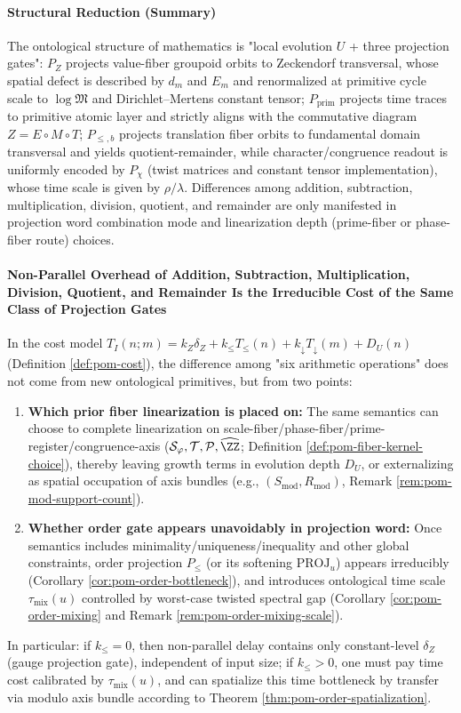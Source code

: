 \paragraph{Structural Reduction (Summary)}
The ontological structure of mathematics is "local evolution $U$ + three projection gates": $P_Z$ projects value-fiber groupoid orbits to Zeckendorf transversal, whose spatial defect is described by $d_m$ and $E_m$ and renormalized at primitive cycle scale to $\log\mathfrak{M}$ and Dirichlet--Mertens constant tensor; $P_{\mathrm{prim}}$ projects time traces to primitive atomic layer and strictly aligns with the commutative diagram $Z=E\circ M\circ T$; $P_{\le,b}$ projects translation fiber orbits to fundamental domain transversal and yields quotient-remainder, while character/congruence readout is uniformly encoded by $P_\chi$ (twist matrices and constant tensor implementation), whose time scale is given by $\rho/\lambda$. Differences among addition, subtraction, multiplication, division, quotient, and remainder are only manifested in projection word combination mode and linearization depth (prime-fiber or phase-fiber route) choices.

\paragraph{Non-Parallel Overhead of Addition, Subtraction, Multiplication, Division, Quotient, and Remainder Is the Irreducible Cost of the Same Class of Projection Gates}
In the cost model
\(
T_I(n;m)=k_Z\delta_Z+k_{\le}T_{\le}(n)+k_{\downarrow}T_{\downarrow}(m)+D_U(n)
\)
(Definition \ref{def:pom-cost}), the difference among "six arithmetic operations" does not come from new ontological primitives, but from two points:
\begin{enumerate}
  \item \textbf{Which prior fiber linearization is placed on:} The same semantics can choose to complete linearization on scale-fiber/phase-fiber/prime-register/congruence-axis (\(\mathcal{S}_\varphi,\mathcal{T},\mathcal{P},\widehat{\ZZ}\); Definition \ref{def:pom-fiber-kernel-choice}), thereby leaving growth terms in evolution depth \(D_U\), or externalizing as spatial occupation of axis bundles (e.g., \((S_{\mathrm{mod}},R_{\mathrm{mod}})\), Remark \ref{rem:pom-mod-support-count}).
  \item \textbf{Whether order gate appears unavoidably in projection word:} Once semantics includes minimality/uniqueness/inequality and other global constraints, order projection \(P_{\le}\) (or its softening \(\mathrm{PROJ}_u\)) appears irreducibly (Corollary \ref{cor:pom-order-bottleneck}), and introduces ontological time scale \(\tau_{\mathrm{mix}}(u)\) controlled by worst-case twisted spectral gap (Corollary \ref{cor:pom-order-mixing} and Remark \ref{rem:pom-order-mixing-scale}).
\end{enumerate}
In particular: if \(k_{\le}=0\), then non-parallel delay contains only constant-level \(\delta_Z\) (gauge projection gate), independent of input size; if \(k_{\le}>0\), one must pay time cost calibrated by \(\tau_{\mathrm{mix}}(u)\), and can spatialize this time bottleneck by transfer via modulo axis bundle according to Theorem \ref{thm:pom-order-spatialization}.

